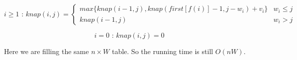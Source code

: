 \documentclass[11pt]{article}
\begin{document}
\begin{description}
\begin{enumerate}
\[i\geq1 \textrm{  :  } knap(i,j)=\left\{\begin{array}{ll} max\{knap(i-1,j),knap(first[f(i)]-1,j-w_i)+v_i\} & w_i\leq j\\ knap(i-1,j) & w_i>j

\end{array}\right.\]

\[i=0 \textrm{  :  } knap(i,j)=0\]

Here we are filling the same $n \times W$ table.  So the running time is still $O(nW)$.


\end{enumerate}


\end{description}
\end{document}
